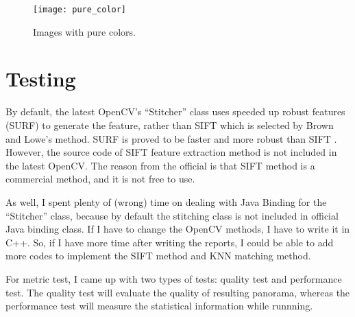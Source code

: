 \documentclass[10pt,twocolumn,letterpaper]{article}
\begin{document}
\begin{figure}[t]
    \begin{center}
        \texttt{[image: pure\_color]}
    \end{center}
    \caption{Images with pure colors.}
    \label{fig:pc}
\end{figure}


\section{Testing}
By default, the latest OpenCV's ``Stitcher'' class uses speeded up robust features (SURF) \cite{surf} to generate the feature,
rather than SIFT which is selected by Brown and Lowe's method.
SURF is proved to be faster and more robust than SIFT \cite{cmp}.
However, the source code of SIFT feature extraction method is not included in the latest OpenCV.
The reason from the official \cite{cvcontri} is that SIFT method is a commercial method, and it is not free to use.

As well, I spent plenty of (wrong) time on dealing with Java Binding for the ``Stitcher'' class,
because by default the stitching class is not included in official Java binding class.
If I have to change the OpenCV methods, I have to write it in C++.
So, if I have more time after writing the reports, I could be able to add more codes to implement the SIFT method and KNN matching method.

For metric test, I came up with two types of tests: quality test and performance test.
The quality test will evaluate the quality of resulting panorama, whereas the performance test will measure the statistical information while runnning.
\end{document}
